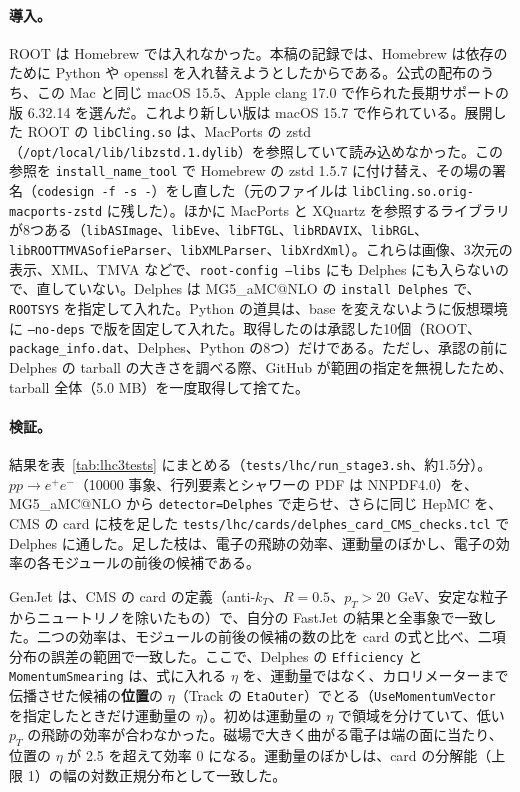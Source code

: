 \documentclass[a4paper,10pt]{ltjsarticle}
\makeatletter
\newcommand{\MGaMC}{MG5\_aMC@NLO}
\makeatother
\begin{document}
\paragraph{導入。}ROOT は Homebrew では入れなかった。本稿の記録では、Homebrew は依存のために Python や openssl を入れ替えようとしたからである。公式の配布のうち、この Mac と同じ macOS 15.5、Apple clang 17.0 で作られた長期サポートの版 6.32.14 を選んだ。これより新しい版は macOS 15.7 で作られている。展開した ROOT の \texttt{libCling.so} は、MacPorts の zstd（\texttt{/opt/local/lib/libzstd.1.dylib}）を参照していて読み込めなかった。この参照を \texttt{install\_name\_tool} で Homebrew の zstd 1.5.7 に付け替え、その場の署名（\texttt{codesign -f -s -}）をし直した（元のファイルは \texttt{libCling.so.orig-macports-zstd} に残した）。ほかに MacPorts と XQuartz を参照するライブラリが8つある（\texttt{libASImage}、\texttt{libEve}、\texttt{libFTGL}、\texttt{libRDAVIX}、\texttt{libRGL}、\texttt{libROOTTMVASofieParser}、\texttt{libXMLParser}、\texttt{libXrdXml}）。これらは画像、3次元の表示、XML、TMVA などで、\texttt{root-config --libs} にも Delphes にも入らないので、直していない。Delphes は \MGaMC{} の \texttt{install Delphes} で、\texttt{ROOTSYS} を指定して入れた。Python の道具は、base を変えないように仮想環境に \texttt{--no-deps} で版を固定して入れた。取得したのは承認した10個（ROOT、\texttt{package\_info.dat}、Delphes、Python の8つ）だけである。ただし、承認の前に Delphes の tarball の大きさを調べる際、GitHub が範囲の指定を無視したため、tarball 全体（5.0 MB）を一度取得して捨てた。

\paragraph{検証。}結果を表~\ref{tab:lhc3tests} にまとめる（\nolinkurl{tests/lhc/run_stage3.sh}、約1.5分）。$pp\to e^+e^-$（10000 事象、行列要素とシャワーの PDF は NNPDF4.0）を、\MGaMC{} から \texttt{detector=Delphes} で走らせ、さらに同じ HepMC を、CMS の card に枝を足した \nolinkurl{tests/lhc/cards/delphes_card_CMS_checks.tcl} で Delphes に通した。足した枝は、電子の飛跡の効率、運動量のぼかし、電子の効率の各モジュールの前後の候補である。

GenJet は、CMS の card の定義（anti-$k_T$、$R=0.5$、$p_T>20$~GeV、安定な粒子からニュートリノを除いたもの）で、自分の FastJet の結果と全事象で一致した。二つの効率は、モジュールの前後の候補の数の比を card の式と比べ、二項分布の誤差の範囲で一致した。ここで、Delphes の \texttt{Efficiency} と \texttt{MomentumSmearing} は、式に入れる $\eta$ を、運動量ではなく、カロリメーターまで伝播させた候補の\textbf{位置}の $\eta$（Track の \texttt{EtaOuter}）でとる（\texttt{UseMomentumVector} を指定したときだけ運動量の $\eta$）。初めは運動量の $\eta$ で領域を分けていて、低い $p_T$ の飛跡の効率が合わなかった。磁場で大きく曲がる電子は端の面に当たり、位置の $\eta$ が 2.5 を超えて効率 0 になる。運動量のぼかしは、card の分解能（上限 1）の幅の対数正規分布として一致した。
\end{document}
